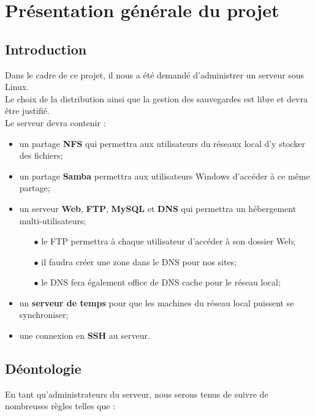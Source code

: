 \section{Présentation générale du projet}
\label{sec:pres-gener-du}


\subsection{Introduction}
\label{sec:introduction}

Dans le cadre de ce projet, il nous a été demandé d'administrer un serveur sous
Linux. \\
Le choix de la distribution ainsi que la gestion des sauvegardes est libre et
devra être justifié. \\

Le serveur devra contenir :

\begin{itemize}
    \item un partage \textbf{NFS} qui permettra aux utilisateurs du réseaux local d'y stocker des fichiers;
    \item un partage \textbf{Samba} permettra aux utilisateurs Windows d'accéder à ce même partage;
    \item un serveur \textbf{Web}, \textbf{FTP}, \textbf{MySQL} et \textbf{DNS} qui permettra un hébergement multi-utilisateurs;
    \begin{itemize}
        \item[$\bullet$] le FTP permettra à chaque utilisateur d'accéder à son dossier Web;
        \item[$\bullet$] il faudra créer une zone dans le DNS pour nos sites;
        \item[$\bullet$] le DNS fera également office de DNS cache pour le réseau local;
    \end{itemize}
    \item un \textbf{serveur de temps} pour que les machines du
    réseau local puissent se synchroniser;
    \item une connexion en \textbf{SSH} au serveur.
\end{itemize}


\newpage


\subsection{Déontologie}
\label{sec:déontologie}

En tant qu'administrateurs du serveur, nous serons tenus de suivre de nombreuses
règles telles que :

